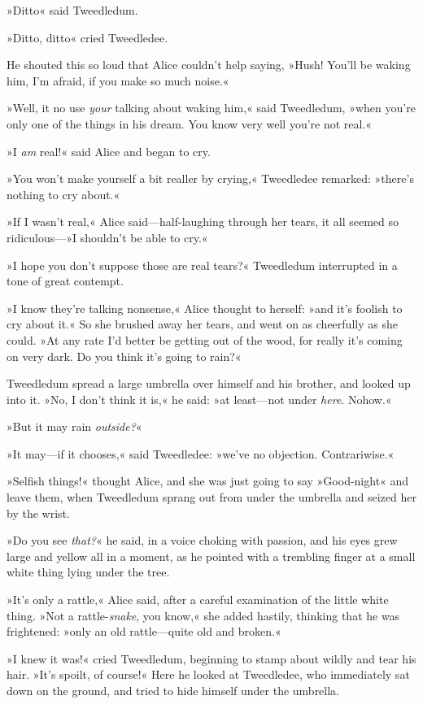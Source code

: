 »Ditto« said Tweedledum.

»Ditto, ditto« cried Tweedledee.

He shouted this so loud that Alice couldn't help saying, »Hush! You'll be waking him, I'm afraid, if you make so much noise.«

»Well, it no use \textit{your} talking about waking him,« said Tweedledum, »when you're only one of the things in his dream. You know very well you're not real.«

»I \textit{am} real!« said Alice and began to cry.

»You won't make yourself a bit realler by crying,« Tweedledee remarked: »there's nothing to cry about.«

»If I wasn't real,« Alice said—half-laughing through her tears, it all seemed so ridiculous—»I shouldn't be able to cry.«

»I hope you don't suppose those are real tears?« Tweedledum interrupted in a tone of great contempt.

»I know they're talking nonsense,« Alice thought to herself: »and it's foolish to cry about it.« So she brushed away her tears, and went on as cheerfully as she could. »At any rate I'd better be getting out of the wood, for really it's coming on very dark. Do you think it's going to rain?«

Tweedledum spread a large umbrella over himself and his brother, and looked up into it. »No, I don't think it is,« he said: »at least—not under \textit{here}. Nohow.«

»But it may rain \textit{outside?}«

»It may—if it chooses,« said Tweedledee: »we've no objection. Contrariwise.«

»Selfish things!« thought Alice, and she was just going to say »Good-night« and leave them, when Tweedledum sprang out from under the umbrella and seized her by the wrist.

»Do you see \textit{that?}« he said, in a voice choking with passion, and his eyes grew large and yellow all in a moment, as he pointed with a trembling finger at a small white thing lying under the tree.

»It's only a rattle,« Alice said, after a careful examination of the little white thing. »Not a rattle-\textit{snake}, you know,« she added hastily, thinking that he was frightened: »only an old rattle—quite old and broken.«

»I knew it was!« cried Tweedledum, beginning to stamp about wildly and tear his hair. »It's spoilt, of course!« Here he looked at Tweedledee, who immediately sat down on the ground, and tried to hide himself under the umbrella.

